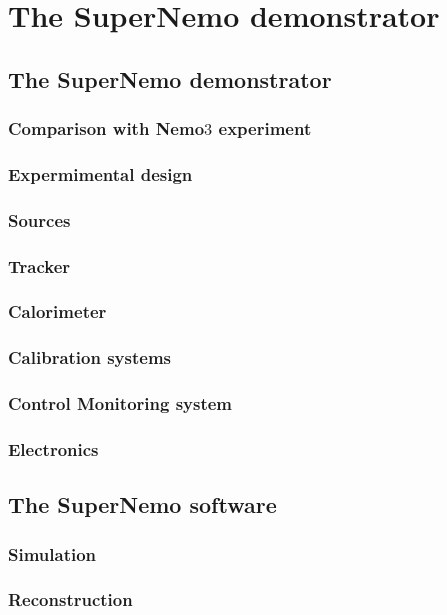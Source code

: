 \chapter{The SuperNemo demonstrator}
\label{ch:detector}

\section{The SuperNemo demonstrator}
\subsection{Comparison with Nemo$3$ experiment}
\subsection{Expermimental design}
\subsection{Sources}
\subsection{Tracker}
\subsection{Calorimeter}
\label{sec:calorimeter}
\subsection{Calibration systems}
\subsection{Control Monitoring system}
\subsection{Electronics}

\section{The SuperNemo software}
\subsection{Simulation}
\subsection{Reconstruction}

